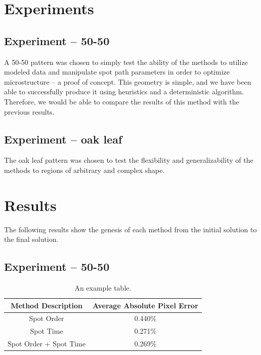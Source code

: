 \documentclass[a4paper]{article}
\begin{document}
\section{Experiments}
\label{sec:experiments}

\subsection{Experiment – 50-50}
\label{subsec:exp50-50}

A 50-50 pattern was chosen to simply test the ability of the methods to utilize modeled data and manipulate spot path parameters in order to optimize microstructure – a proof of concept. This geometry is simple, and we have been able to successfully produce it using heuristics and a deterministic algorithm. Therefore, we would be able to compare the results of this method with the previous results. 


\subsection{Experiment – oak leaf}
\label{subsec:expleaf}

The oak leaf pattern was chosen to test the flexibility and generalizability of the methods to regions of arbitrary and complex shape. 


\section{Results}
\label{sec:results}

The following results show the genesis of each method from the initial solution to the final solution. 


\subsection{Experiment – 50-50}
\label{subsec:result50-50}

\begin{table}
\centering
\begin{tabular}{c|c}
\textbf{Method Description} & \textbf{Average Absolute Pixel Error} \\\hline
Spot Order & 0.440\% \\
Spot Time & 0.271\% \\
Spot Order + Spot Time & 0.269\%
\end{tabular}
\caption{\label{tab:result50}An example table.}
\end{table}
\end{document}
